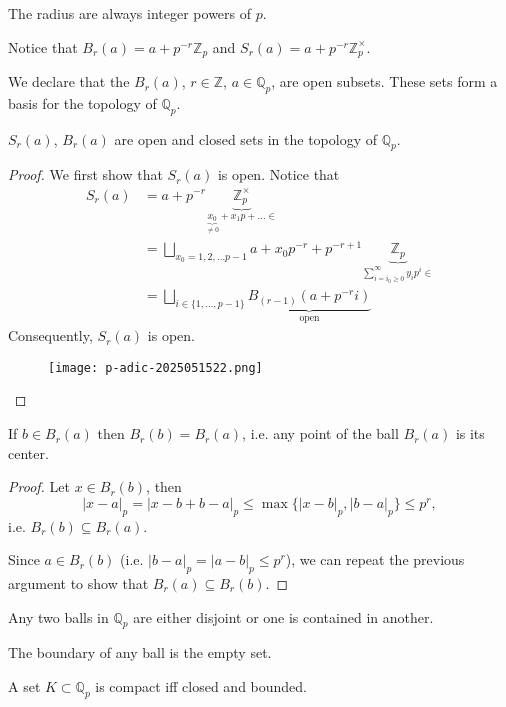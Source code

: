 The radius are always integer powers of $p$.

\begin{remark}
Notice that $B_{r}(a)=a+p^{-r}\mathbb{Z}_{p}$ and $S_{r}(a)=a+p^{-r}\mathbb{Z}_{p}^{\times}$.
\end{remark}
We declare that the $B_{r}(a)$, $r\in \mathbb{Z}$, $a\in \mathbb{Q}_{p}$, are open subsets. These sets form a basis for the topology of $\mathbb{Q}_{p}$.

\begin{proposition}
$S_{r}(a)$, $B_{r}(a)$ are open and closed sets in the topology of $\mathbb{Q}_{p}$.
\end{proposition}
\begin{proof}
We first show that $S_{r}(a)$ is open. Notice that
\[
\begin{aligned}
S_{r}(a) & =a+p^{-r}\underbrace{ \mathbb{Z}_{p}^{\times} }_{ \underbrace{ x_0 }_{ \neq 0 }+x_1p+\dots\in } \\
 & =\bigsqcup_{x_0=1,2,\dots p-1}a+x_0p^{-r}+p^{-r+1}\underbrace{ \mathbb{Z}_{p} }_{ \sum_{i=i_0\geq 0}^{\infty}y_ip^{i}\in  } \\
 & =\bigsqcup _{i\in \{ 1,\dots,p-1 \}}\underbrace{ B_{(r-1)}(a+p^{-r}i) }_{ \text{open} } 
\end{aligned}
\]
Consequently, $S_{r}(a)$ is open.

\begin{figure}[H]
\centering
\texttt{[image: p-adic-2025051522.png]}
\label{}
\end{figure}

\end{proof}

\begin{lemma}
If $b \in B_r(a)$ then $B_r(b) = B_r(a)$, i.e. any point of the ball $B_r(a)$ is its center.
\end{lemma}
\begin{proof}
Let $x \in B_r(b)$, then
\[
|x - a|_p = |x - b + b - a|_p \leq \max \{ |x - b|_p, |b - a|_p \} \leq p^r,
\]
i.e. $B_r(b) \subseteq B_r(a)$.

Since $a \in B_r(b)$ (i.e. $|b - a|_p = |a - b|_p \leq p^r$), we can repeat the previous argument to show that $B_r(a) \subseteq B_r(b)$.
\end{proof}

\begin{exercise}
Any two balls in $\mathbb{Q}_{p}$ are either disjoint or one is contained in another.
\end{exercise}
\begin{exercise}
The boundary of any ball is the empty set.
\end{exercise}
\begin{theorem}
A set $K\subset \mathbb{Q}_{p}$ is compact iff closed and bounded.
\end{theorem}
